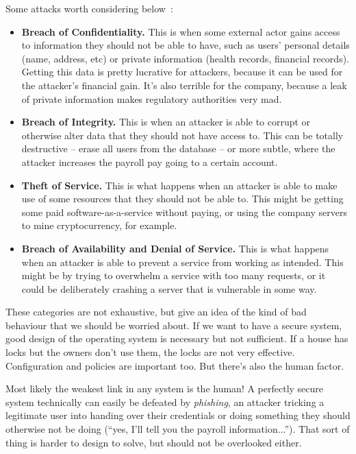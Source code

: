Some attacks worth considering below~\cite{osc}:
\begin{itemize}
	\item \textbf{Breach of Confidentiality.} This is when some external actor gains access to information they should not be able to have, such as users' personal details (name, address, etc) or private information (health records, financial records). Getting this data is pretty lucrative for attackers, because it can be used for the attacker's financial gain. It's also terrible for the company, because a leak of private information makes regulatory authorities very mad.
	
	\item \textbf{Breach of Integrity.} This is when an attacker is able to corrupt or otherwise alter data that they should not have access to. This can be totally destructive -- erase all users from the database -- or more subtle, where the attacker increases the payroll pay going to a certain account. 
	
	\item \textbf{Theft of Service.} This is what happens when an attacker is able to make use of some resources that they should not be able to. This might be getting some paid software-as-a-service without paying, or using the company servers to mine cryptocurrency, for example.
	
	\item \textbf{Breach of Availability and Denial of Service.} This is what happens when an attacker is able to prevent a service from working as intended. This might be by trying to overwhelm a service with too many requests, or it could be deliberately crashing a server that is vulnerable in some way. 
	
\end{itemize}

These categories are not exhaustive, but give an idea of the kind of bad behaviour that we should be worried about. If we want to have a secure system, good design of the operating system is necessary but not sufficient. If a house has locks but the owners don't use them, the locks are not very effective. Configuration and policies are important too. But there's also the human factor.

Most likely the weakest link in any system is the human! A perfectly secure system technically can easily be defeated by \textit{phishing}, an attacker tricking a legitimate user into handing over their credentials or doing something they should otherwise not be doing (``yes, I'll tell you the payroll information...''). That sort of thing is harder to design to solve, but should not be overlooked either.

